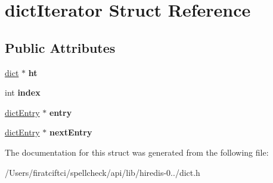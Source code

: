 \hypertarget{structdict_iterator}{}\section{dict\+Iterator Struct Reference}
\label{structdict_iterator}
\subsection*{Public Attributes}
\begin{DoxyCompactItemize}
\item 
\mbox{\label{structdict_iterator_a14f584254205095705fe57b5e79f1f97}} 
\mbox{\hyperlink{structdict}{dict}} $\ast$ {\bfseries ht}
\item 
\mbox{\label{structdict_iterator_aa9a6fc11b0a8222996b778f264f8ec9e}} 
int {\bfseries index}
\item 
\mbox{\label{structdict_iterator_a5bbcc9b0c792e1ee68c6a4ed049da816}} 
\mbox{\hyperlink{structdict_entry}{dict\+Entry}} $\ast$ {\bfseries entry}
\item 
\mbox{\label{structdict_iterator_aa030de14f2996420066a50980581d0d8}} 
\mbox{\hyperlink{structdict_entry}{dict\+Entry}} $\ast$ {\bfseries next\+Entry}
\end{DoxyCompactItemize}


The documentation for this struct was generated from the following file\+:\begin{DoxyCompactItemize}
\item 
/\+Users/firatciftci/spellcheck/api/lib/hiredis-\/0../dict.\+h\end{DoxyCompactItemize}
